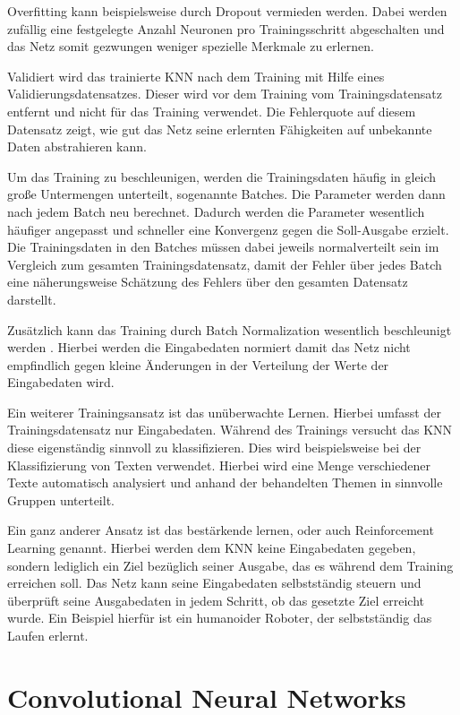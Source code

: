 Overfitting kann beispielsweise durch Dropout vermieden werden. Dabei werden zufällig eine festgelegte Anzahl Neuronen pro Trainingsschritt abgeschalten und das Netz somit gezwungen weniger spezielle Merkmale zu erlernen.  

Validiert wird das trainierte KNN nach dem Training mit Hilfe eines Validierungsdatensatzes. Dieser  wird vor dem Training vom Trainingsdatensatz entfernt und nicht für das Training verwendet. Die Fehlerquote auf diesem Datensatz zeigt, wie gut das Netz seine erlernten Fähigkeiten auf unbekannte Daten abstrahieren kann. 

Um das Training zu beschleunigen, werden die Trainingsdaten häufig in gleich große Untermengen unterteilt, sogenannte Batches. Die Parameter werden dann nach jedem Batch neu berechnet. Dadurch werden die Parameter wesentlich häufiger angepasst und schneller eine Konvergenz gegen die Soll-Ausgabe erzielt. Die Trainingsdaten in den Batches müssen dabei jeweils normalverteilt sein im Vergleich zum gesamten Trainingsdatensatz, damit der Fehler über jedes Batch eine näherungsweise Schätzung des Fehlers über den gesamten Datensatz darstellt. 

Zusätzlich kann das Training durch Batch Normalization wesentlich beschleunigt werden \cite{Ioffe2015}. Hierbei werden die Eingabedaten normiert damit das Netz nicht empfindlich gegen kleine Änderungen in der Verteilung der Werte der Eingabedaten wird.

Ein weiterer Trainingsansatz ist das unüberwachte Lernen. Hierbei umfasst der Trainingsdatensatz nur Eingabedaten. Während des Trainings versucht das KNN diese eigenständig sinnvoll zu klassifizieren. Dies wird beispielsweise bei der Klassifizierung von Texten verwendet. Hierbei wird eine Menge verschiedener Texte automatisch analysiert und anhand der behandelten Themen in sinnvolle Gruppen unterteilt. 

Ein ganz anderer Ansatz ist das bestärkende lernen, oder auch Reinforcement Learning genannt. Hierbei werden dem KNN keine Eingabedaten gegeben, sondern lediglich ein Ziel bezüglich seiner Ausgabe, das es während dem Training erreichen soll. Das Netz kann seine Eingabedaten selbstständig steuern und überprüft seine Ausgabedaten in jedem Schritt, ob das gesetzte Ziel erreicht wurde. Ein Beispiel hierfür ist ein humanoider Roboter, der selbstständig das Laufen erlernt. 

\section[Convolutional Neural Networks (Schmelzer)]{Convolutional Neural Networks}

